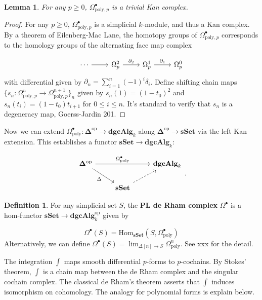 \documentclass[psamsfonts]{amsart}
\newtheorem{lem}{Lemma}[section]
\theoremstyle{definition}
\newtheorem{defn}{Definition}[section]
\newcommand{\sSet}{\mathbf{sSet}}
\newcommand{\dgcAlg}{\mathbf{dgcAlg}}
\newcommand{\Hom}{\mathrm{Hom}}
\numberwithin{equation}{section}
\begin{document}
\begin{lem}
For any $p\geq0$, $\Omega^\bullet_{\mathrm{poly},p}$ is a trivial Kan complex.
\end{lem}
\begin{proof}
For any $p\geq0$, $\Omega^\bullet_{\textrm{poly},p}$ is a simplicial $k$-module, and thus a Kan complex. By a theorem of Eilenberg-Mac Lane, the homotopy groups of $\Omega^\bullet_{\textrm{poly},p}$ corresponds to the homology groups of the alternating face map complex

\[\begin{tikzcd}
\cdots\arrow[r]&\Omega^2_p\arrow[r,"\partial_2"]&\Omega^1_p\arrow[r,"\partial_1"]&\Omega^0_p\end{tikzcd}\]
with differential given by $\partial_n=\sum_{i=1}^n(-1)^i\delta_i$. Define shifting chain maps $\{s_n:\Omega^n_{\textrm{poly},p}\to\Omega^{n+1}_{\textrm{poly},p}\}_{n}$ given by $s_n(1)=(1-t_0)^2$ and $s_n(t_i)=(1-t_0)t_{i+1}$ for $0\leq i\leq n$. It's standard to verify that $s_n$ is a degeneracy map, Goerss-Jardin 201. 
\end{proof}

Now we can extend $\Omega^\bullet_\textrm{poly}:\mathbf{\Delta}^\textrm{op}\to\dgcAlg_k$ along $\mathbf{\Delta}^\textrm{op}\to\sSet$ via the left Kan extension. This establishes a functor $\sSet\to\dgcAlg_k$:

\[\begin{tikzcd}
\mathbf{\Delta}^\textrm{op}\arrow[swap]{dr}{\Delta}\arrow{rr}{\Omega^\bullet_\textrm{poly}}&&\dgcAlg_k\\
&\sSet\arrow[swap,near start,dashed]{ur}
\end{tikzcd}.\]

\begin{defn}
For any simplicial set $S$, the \textbf{PL de Rham complex} $\Omega^\bullet$ is a hom-functor $\sSet\to\dgcAlg_k^\mathrm{op}$ given by

\[\Omega^\bullet(S)=\Hom_\sSet(S,\Omega^\bullet_\textrm{poly})\]
Alternatively, we can define $\Omega^\bullet(S)=\lim_{\Delta[n]\to S}\Omega^n_\textrm{poly}$. See xxx for the detail.
\end{defn}

The integration $\int$ maps smooth differential $p$-forms to $p$-cochains. By Stokes' theorem, $\int$ is a chain map between the de Rham complex and the singular cochain complex. The classical de Rham's theorem asserts that $\int$ induces isomorphism on cohomology. The analogy for polynomial forms is explain below.
\end{document}

